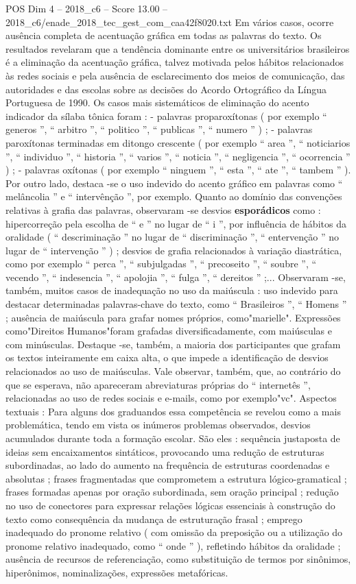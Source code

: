 \begin{textsample}{POS Dim 4 – 2018\_c6 – Score 13.00 – 2018\_c6/enade\_2018\_tec\_gest\_com\_caa42f8020.txt}
Em vários casos, ocorre ausência completa de acentuação gráfica em todas as palavras do texto.
Os resultados revelaram que a tendência dominante entre os universitários brasileiros é a eliminação da acentuação gráfica, talvez motivada pelos hábitos relacionados às redes sociais e pela ausência de esclarecimento dos meios de comunicação, das autoridades e das escolas sobre as decisões do Acordo Ortográfico da Língua Portuguesa de 1990.
Os casos mais sistemáticos de eliminação do acento indicador da sílaba tônica foram : - palavras proparoxítonas ( por exemplo “ generos ”, “ arbitro ”, “ politico ”, “ publicas ”, “ numero ” ) ; - palavras paroxítonas terminadas em ditongo crescente ( por exemplo “ area ”, “ noticiarios ”, “ individuo ”, “ historia ”, “ varios ”, “ noticia ”, “ negligencia ”, “ ocorrencia ” ) ; - palavras oxítonas ( por exemplo “ ninguem ”, “ esta ”, “ ate ”, “ tambem ” ).
Por outro lado, destaca -se o uso indevido do acento gráfico em palavras como “ melâncolia ” e “ intervênção ”, por exemplo.
Quanto ao domínio das convenções relativas à grafia das palavras, observaram -se desvios \textbf{esporádicos} como : hipercorreção pela escolha de “ e ” no lugar de “ i ”, por influência de hábitos da oralidade ( “ descriminação ” no lugar de “ discriminação ”, “ entervenção ” no lugar de “ intervenção ” ) ; desvios de grafia relacionados à variação diastrática, como por exemplo “ perca ”, “ subjulgadas ”, “ precoseito ”, “ soubre ”, “ vecendo ”, “ indesencia ”, “ apolojia ”, “ fulga ”, “ dereitos ” ;...
Observaram -se, também, muitos casos de inadequação no uso da maiúscula : uso indevido para destacar determinadas palavras-chave do texto, como “ Brasileiros ”, “ Homens ” ; ausência de maiúscula para grafar nomes próprios, como"marielle".
Expressões como"Direitos Humanos"foram grafadas diversificadamente, com maiúsculas e com minúsculas.
Destaque -se, também, a maioria dos participantes que grafam os textos inteiramente em caixa alta, o que impede a identificação de desvios relacionados ao uso de maiúsculas.
Vale observar, também, que, ao contrário do que se esperava, não apareceram abreviaturas próprias do “ internetês ”, relacionadas ao uso de redes sociais e e-mails, como por exemplo"vc".
Aspectos textuais : Para alguns dos graduandos essa competência se revelou como a mais problemática, tendo em vista os inúmeros problemas observados, desvios acumulados durante toda a formação escolar.
São eles : sequência justaposta de ideias sem encaixamentos sintáticos, provocando uma redução de estruturas subordinadas, ao lado do aumento na frequência de estruturas coordenadas e absolutas ; frases fragmentadas que comprometem a estrutura lógico-gramatical ; frases formadas apenas por oração subordinada, sem oração principal ; redução no uso de conectores para expressar relações lógicas essenciais à construção do texto como consequência da mudança de estruturação frasal ; emprego inadequado do pronome relativo ( com omissão da preposição ou a utilização do pronome relativo inadequado, como “ onde ” ), refletindo hábitos da oralidade ; ausência de recursos de referenciação, como substituição de termos por sinônimos, hiperônimos, nominalizações, expressões metafóricas.

\end{textsample}

